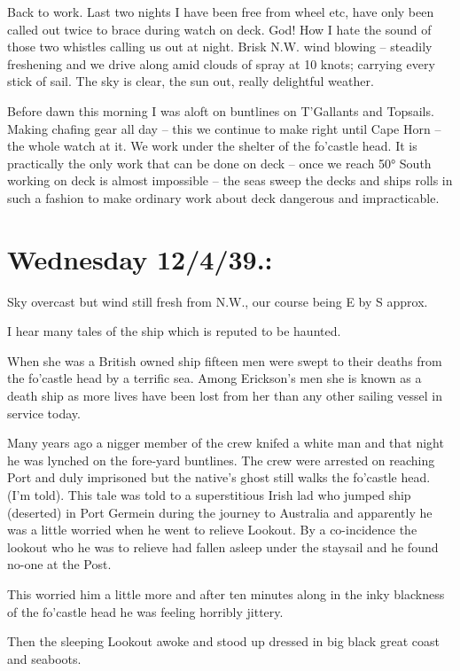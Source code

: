 \documentclass[
  11pt,
  msmallroyalvopaper
]{memoir}
\begin{document}
Back to work. Last two nights I have been free from wheel etc, have only
been called out twice to brace during watch on deck. God! How I hate the
sound of those two whistles calling us out at night. Brisk N.W. wind
blowing -- steadily freshening and we drive along amid clouds of spray
at 10 knots; carrying every stick of sail. The sky is clear, the sun
out, really delightful weather.

Before dawn this morning I was aloft on buntlines on T'Gallants and
Topsails. Making chafing gear all day -- this we continue to make right
until Cape Horn -- the whole watch at it. We work under the shelter of
the fo'castle head. It is practically the only work that can be done on
deck -- once we reach 50° South working on deck is almost impossible --
the seas sweep the decks and ships rolls in such a fashion to make
ordinary work about deck dangerous and impracticable.

\hypertarget{wednesday-12439.}{%
\section{Wednesday 12/4/39.:}\label{wednesday-12439.}}

Sky overcast but wind still fresh from N.W., our course being E by S
approx.

I hear many tales of the ship which is reputed to be haunted.

When she was a British owned ship fifteen men were swept to their deaths
from the fo'castle head by a terrific sea. Among Erickson's men she is
known as a death ship as more lives have been lost from her than any
other sailing vessel in service today.

Many years ago a nigger member of the crew knifed a white man and that
night he was lynched on the fore-yard buntlines. The crew were arrested
on reaching Port and duly imprisoned but the native's ghost still walks
the fo'castle head. (I'm told). This tale was told to a superstitious
Irish lad who jumped ship (deserted) in Port Germein during the journey
to Australia and apparently he was a little worried when he went to
relieve Lookout. By a co-incidence the lookout who he was to relieve had
fallen asleep under the staysail and he found no-one at the Post.

This worried him a little more and after ten minutes along in the inky
blackness of the fo'castle head he was feeling horribly jittery.

Then the sleeping Lookout awoke and stood up dressed in big black great
coast and seaboots.
\end{document}
